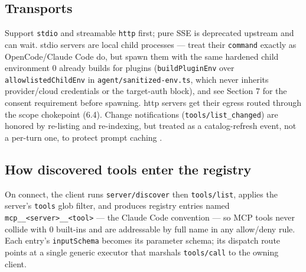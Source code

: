 \documentclass[11pt]{article}
\begin{document}
\subsection{Transports}

Support \texttt{stdio} and streamable \texttt{http} first; pure SSE is deprecated
upstream \cite{claudecode-mcp} and can wait. stdio servers are local child
processes --- treat their \texttt{command} exactly as OpenCode/Claude Code do,
but spawn them with the same hardened child environment 0 already builds for
plugins (\texttt{buildPluginEnv} over \texttt{allowlistedChildEnv} in
\texttt{agent/sanitized-env.ts}, which never inherits provider/cloud credentials
or the target-auth block), and see Section 7 for the consent requirement before
spawning. http servers get
their egress routed through the scope chokepoint (6.4). Change notifications
(\texttt{tools/list\_changed}) are honored by re-listing and re-indexing, but
treated as a catalog-refresh event, not a per-turn one, to protect prompt
caching \cite{mcp-clientbp}.

\subsection{How discovered tools enter the registry}

On connect, the client runs \texttt{server/discover} then \texttt{tools/list},
applies the server's \texttt{tools} glob filter, and produces registry entries
named \texttt{mcp\_\_<server>\_\_<tool>} --- the Claude Code convention
\cite{claudecode-mcp} --- so MCP tools never collide with 0 built-ins and are
addressable by full name in any allow/deny rule. Each entry's
\texttt{inputSchema} becomes its parameter schema; its dispatch route points at a
single generic executor that marshals \texttt{tools/call} to the owning client.
\end{document}
